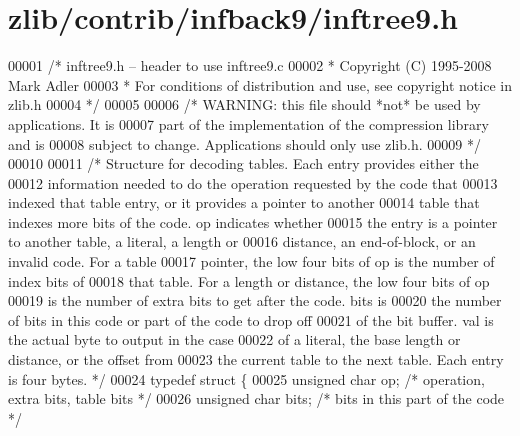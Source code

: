 \hypertarget{zlib_2contrib_2infback9_2inftree9_8h_source}{}\section{zlib/contrib/infback9/inftree9.h}
\label{zlib_2contrib_2infback9_2inftree9_8h_source}

\begin{DoxyCode}
00001 \textcolor{comment}{/* inftree9.h -- header to use inftree9.c}
00002 \textcolor{comment}{ * Copyright (C) 1995-2008 Mark Adler}
00003 \textcolor{comment}{ * For conditions of distribution and use, see copyright notice in zlib.h}
00004 \textcolor{comment}{ */}
00005 
00006 \textcolor{comment}{/* WARNING: this file should *not* be used by applications. It is}
00007 \textcolor{comment}{   part of the implementation of the compression library and is}
00008 \textcolor{comment}{   subject to change. Applications should only use zlib.h.}
00009 \textcolor{comment}{ */}
00010 
00011 \textcolor{comment}{/* Structure for decoding tables.  Each entry provides either the}
00012 \textcolor{comment}{   information needed to do the operation requested by the code that}
00013 \textcolor{comment}{   indexed that table entry, or it provides a pointer to another}
00014 \textcolor{comment}{   table that indexes more bits of the code.  op indicates whether}
00015 \textcolor{comment}{   the entry is a pointer to another table, a literal, a length or}
00016 \textcolor{comment}{   distance, an end-of-block, or an invalid code.  For a table}
00017 \textcolor{comment}{   pointer, the low four bits of op is the number of index bits of}
00018 \textcolor{comment}{   that table.  For a length or distance, the low four bits of op}
00019 \textcolor{comment}{   is the number of extra bits to get after the code.  bits is}
00020 \textcolor{comment}{   the number of bits in this code or part of the code to drop off}
00021 \textcolor{comment}{   of the bit buffer.  val is the actual byte to output in the case}
00022 \textcolor{comment}{   of a literal, the base length or distance, or the offset from}
00023 \textcolor{comment}{   the current table to the next table.  Each entry is four bytes. */}
00024 \textcolor{keyword}{typedef} \textcolor{keyword}{struct }\{
00025     \textcolor{keywordtype}{unsigned} \textcolor{keywordtype}{char} op;           \textcolor{comment}{/* operation, extra bits, table bits */}
00026     \textcolor{keywordtype}{unsigned} \textcolor{keywordtype}{char} bits;         \textcolor{comment}{/* bits in this part of the code */}

\end{DoxyCode}
